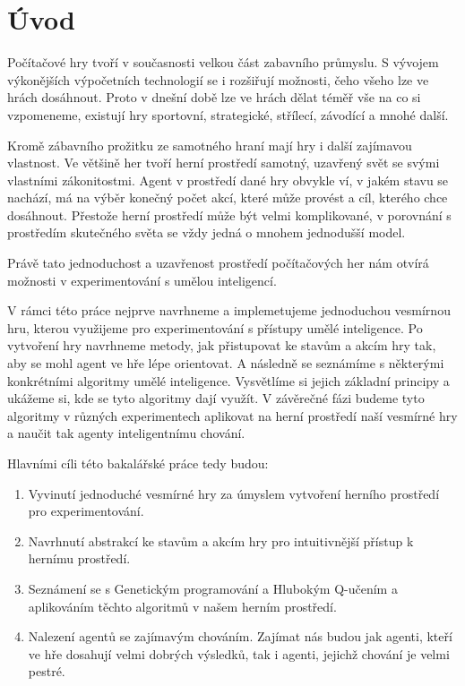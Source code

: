 \chapter*{Úvod}


Počítačové hry tvoří v současnosti velkou část zabavního průmyslu. S vývojem výkonějších výpočetních technologií se i rozšiřují možnosti, čeho všeho lze ve hrách dosáhnout.
Proto v dnešní době lze ve hrách dělat téměř vše na co si vzpomeneme, existují hry sportovní, strategické, střílecí, závodící a mnohé další.
\par
Kromě zábavního prožitku ze samotného hraní mají hry i další zajímavou vlastnost.
Ve většině her tvoří herní prostředí samotný, uzavřený svět se svými vlastními zákonitostmi.
Agent v prostředí dané hry obvykle ví, v jakém stavu se nachází, má na výběr konečný počet akcí, které může provést
a cíl, kterého chce dosáhnout.
Přestože herní prostředí může být velmi komplikované, v porovnání s prostředím skutečného světa se vždy jedná o mnohem jednodušší model.

\par
Právě tato jednoduchost a uzavřenost prostředí počítačových her nám otvírá možnosti v experimentování s umělou inteligencí.

\par
V rámci této práce nejprve navrhneme a implemetujeme jednoduchou vesmírnou hru, kterou využijeme pro experimentování s přístupy umělé inteligence.
Po vytvoření hry navrhneme metody, jak přistupovat ke stavům a akcím hry tak, aby se mohl agent ve hře lépe orientovat.
A následně se seznámíme s některými konkrétními algoritmy umělé inteligence. Vysvětlíme si jejich základní principy a ukážeme si, kde se tyto algoritmy dají využít.
V závěrečné fázi budeme tyto algoritmy v různých experimentech aplikovat na herní prostředí naší vesmírné hry a naučit tak agenty inteligentnímu chování.

Hlavními cíli této bakalářské práce tedy budou:
\begin{enumerate}
    \item Vyvinutí jednoduché vesmírné hry za úmyslem vytvoření herního prostředí pro experimentování.
    \item Navrhnutí abstrakcí ke stavům a akcím hry pro intuitivnější přístup k hernímu prostředí.
    \item Seznámení se s Genetickým programování a Hlubokým Q-učením a aplikováním těchto algoritmů v našem herním prostředí.
    \item Nalezení agentů se zajímavým chováním. Zajímat nás budou jak agenti, kteří ve hře dosahují velmi dobrých výsledků, tak i agenti, jejichž chování je velmi pestré.
\end{enumerate}